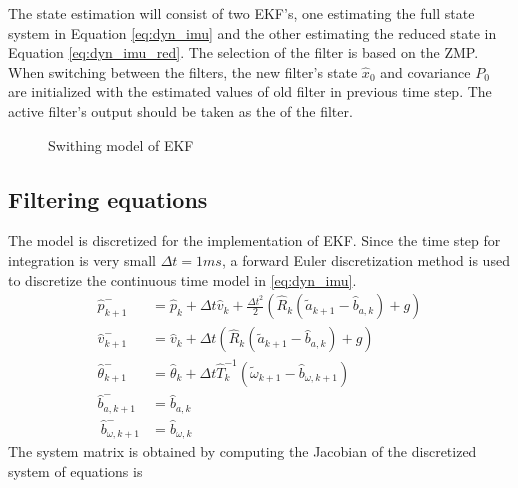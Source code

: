 The state estimation will consist of two EKF's, one estimating the full state system in Equation \ref{eq:dyn_imu} and the other estimating the reduced state in Equation \ref{eq:dyn_imu_red}. The selection of the filter is based on the ZMP. When switching between the filters, the new filter's state $\hat{x}_0$ and covariance $P_0$ are initialized with the estimated values of old filter in previous time step. The active filter's output should be taken as the of the filter.

\begin{figure}
	\centering
	
	\caption{Swithing model of EKF}
	\label{fig:ekf_switch}
\end{figure}

\subsection{Filtering equations}

The model is discretized for the implementation of EKF. Since the time step for integration is very small $\Delta t = 1ms$, a forward Euler discretization method is used to discretize the continuous time model in \ref{eq:dyn_imu}.
\begin{equation}
    \label{eq:dyn_imu_disc}
    \begin{split}
    \hat{p}_{k+1}^- &= \hat{p}_k + \Delta t \hat{v}_k + \frac{\Delta t^2}{2} (\hat{R}_k (\tilde{a}_{k+1} - \hat{b}_{a,k})+g) \\
    \hat{v}_{k+1}^- &= \hat{v}_k + \Delta t (\hat{R}_k (\tilde{a}_{k+1} - \hat{b}_{a,k})+g) \\
    \hat{\theta}_{k+1}^- &= \hat{\theta}_k + \Delta t \hat{T}_k^{-1}(\tilde{\omega}_{k+1} - \hat{b}_{\omega,k+1}) \\
    \hat{b}_{a,k+1}^- &= \hat{b}_{a,k}\\\
    \hat{b}_{\omega,k+1}^- &= \hat{b}_{\omega,k}
    \end{split}
\end{equation}
The system matrix is obtained by computing the Jacobian of the discretized system of equations is
